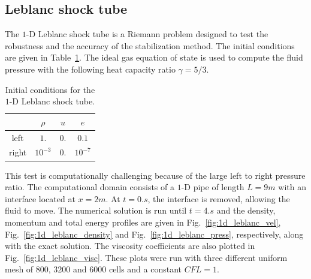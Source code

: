 \documentclass[preprint,10pt]{elsarticle}
\newcommand{\fig}[1]{Fig.~\ref{#1}}                      %
\newcommand{\tbl}[1]{Table~\ref{#1}}                     %
\begin{document}
\subsection{Leblanc shock tube} \label{sec:Leblanc}
The $1$-D Leblanc shock tube is a Riemann problem designed to test the robustness and the accuracy of the stabilization method. The initial conditions are given in \tbl{tbl:ic_leblanc}. The ideal gas equation of state is used to compute the fluid pressure with the following heat capacity ratio $\gamma=5/3$.
\begin{table}[H]
\begin{center}
 \caption{\label{tbl:ic_leblanc} Initial conditions for the $1$-D Leblanc shock tube.}
 \begin{tabular}{|c|c|c|c|}
 \hline
   & $\rho$ & $u$ & $e$ \\
 \hline
left & $1.$ & $0.$ & $0.1$ \\
  \hline
  right & $10^{-3}$ & $0.$ & $10^{-7}$ \\
  \hline
\end{tabular}
\end{center}
\nonumber
\end{table}
This test is computationally challenging because of the large left to right pressure ratio.
The computational domain consists of a $1$-D pipe of length $L=9m$ with an interface located at $x=2m$. At $t=0.s$, the interface is removed, allowing the fluid to move. The numerical solution is run until $t=4.s$ and the density, momentum and total energy profiles are given in \fig{fig:1d_leblanc_vel}, \fig{fig:1d_leblanc_density} and \fig{fig:1d_leblanc_press}, respectively, along with the exact solution. The viscosity coefficients are also plotted in \fig{fig:1d_leblanc_visc}. These plots were  run with three different uniform mesh of $800$, $3200$ and $6000$ cells and a constant $CFL = 1$.
\end{document}
